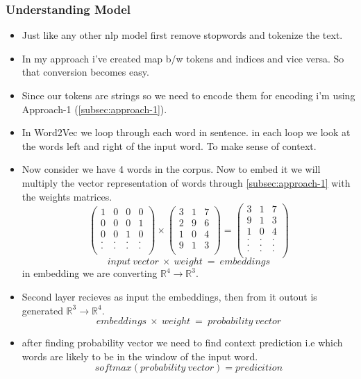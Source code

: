 \documentclass{article}
\begin{document}
\subsubsection{Understanding Model}
\begin{itemize}
    \item Just like any other nlp model first remove stopwords and tokenize the text.
    \item In my approach i've created map b/w tokens and indices and vice versa. So that conversion becomes easy. 
    \item Since our tokens are strings so we need to encode them for encoding i'm using Approach-1 (\ref{subsec:approach-1}).
    \item In Word2Vec we loop through each word in sentence. in each loop we look at the words left and right of the input word. To make sense of context.
    \item Now consider we have 4 words in the corpus. Now to embed it we will multiply the vector representation of words through \ref{subsec:approach-1} with the weights matrices.
    $$
    \begin{pmatrix}
1 & 0 & 0 & 0\\
0 & 0 & 0 & 1\\
0 & 0 & 1 & 0\\
. & . & . & .\\
. & . & . & .\\
\end{pmatrix}
\times 
\begin{pmatrix}
3 & 1 & 7\\
2 & 9 & 6\\
1 & 0 & 4\\
9 & 1 & 3\\
\end{pmatrix}
=
\begin{pmatrix}
3 & 1 & 7\\
9 & 1 & 3\\
1 & 0 & 4\\
. & . & .\\
. & . & .\\
. & . & .\\
\end{pmatrix}
    $$
    $$
    input \ vector\  \times \ weight\ = \ embeddings
    $$
in embedding we are converting $\mathbb{R}^{4} \rightarrow \mathbb{R}^{3}$.
\item Second layer recieves as input the embeddings, then from it outout is generated $\mathbb{R}^{3} \rightarrow \mathbb{R}^{4}$.
$$
    embeddings\  \times \ weight\ = \ probability\ vector
$$
\item after finding probability vector we need to find context prediction i.e which words are likely to be in the window of the input word.
$$
softmax(probability\ vector) = predicition 
$$
\end{itemize}
\end{document}
